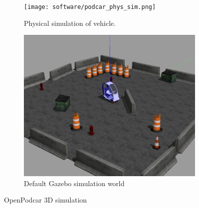 \documentclass[a4paper]{article}
\begin{document}
	\begin{figure}
		\centering
		\begin{subfigure}{0.45\textwidth}
			\centering
			\texttt{[image: software/podcar\_phys\_sim.png]}
			\caption{Physical simulation of vehicle.}
			\label{fig:physSim}
		\end{subfigure}	
		\quad
		\begin{subfigure}{0.45\textwidth}
			\centering
			\includegraphics[width=0.85\columnwidth]{figs_sim/podcar_loaded_gazebo.png}
			\caption{Default Gazebo simulation world}
			\label{fig:sim_world}
		\end{subfigure}
		\caption{OpenPodcar 3D simulation}
	\end{figure}
	
\end{document}
